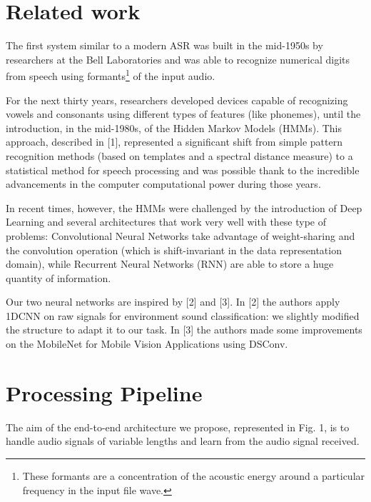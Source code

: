 \documentclass[conference]{IEEEtran}
\begin{document}

\section{Related work}
The first system similar to a modern ASR was built in the mid-1950s by researchers at the Bell Laboratories and was able to recognize numerical digits from speech using formants\footnote{These formants are a concentration of the acoustic energy around a particular frequency in the input file wave.} of the input audio.  

For the next thirty years, researchers developed devices capable of recognizing vowels and consonants using different types of features (like phonemes), until the introduction, in the mid-1980s, of the Hidden Markov Models (HMMs). This approach, described in [1], represented a significant shift from simple pattern recognition methods (based on templates and a spectral distance measure) to a statistical method for speech processing and was possible thank to the incredible advancements in the computer computational power during those years.

In recent times, however, the HMMs were challenged by the introduction of Deep Learning and several architectures that work very well with these type of problems: Convolutional Neural Networks take advantage of weight-sharing and the convolution operation (which is shift-invariant in the data representation domain), while Recurrent Neural Networks (RNN) are able to store a huge quantity of information.

Our two neural networks are inspired by [2] and [3]. In [2] the authors apply 1DCNN on raw signals for environment sound classification: we slightly modified the structure to adapt it to our task. In [3] the authors made some improvements on the MobileNet for Mobile Vision Applications using DSConv. 
\hfill

\section{Processing Pipeline}
The aim of the end-to-end architecture we propose, represented in Fig. 1, is to handle audio signals of variable lengths and learn from the audio signal received.
\end{document}
